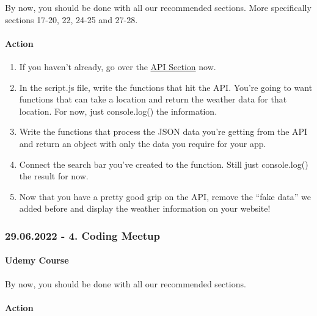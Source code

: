 \documentclass[
]{article}
\providecommand{\tightlist}{%
  \setlength{\itemsep}{0pt}\setlength{\parskip}{0pt}}
\begin{document}
By now, you should be done with all our recommended sections. More specifically sections 17-20, 22, 24-25 and 27-28.

\hypertarget{action-2}{%
\paragraph*{Action}\label{action-2}}

\begin{enumerate}
\def\labelenumi{\arabic{enumi}.}
\tightlist
\item
  If you haven't already, go over the \protect\hyperlink{api}{API Section} now.
\item
  In the script.js file, write the functions that hit the API. You're going to want functions that can take a location and return the weather data for that location. For now, just console.log() the information.
\item
  Write the functions that process the JSON data you're getting from the API and return an object with only the data you require for your app.
\item
  Connect the search bar you've created to the function. Still just console.log() the result for now.
\item
  Now that you have a pretty good grip on the API, remove the ``fake data'' we added before and display the weather information on your website!
\end{enumerate}

\hypertarget{coding-meetup-3}{%
\subsubsection*{29.06.2022 - 4. Coding Meetup}\label{coding-meetup-3}}

\hypertarget{udemy-course-3}{%
\paragraph*{Udemy Course}\label{udemy-course-3}}

By now, you should be done with all our recommended sections.

\hypertarget{action-3}{%
\paragraph*{Action}\label{action-3}}
\end{document}
